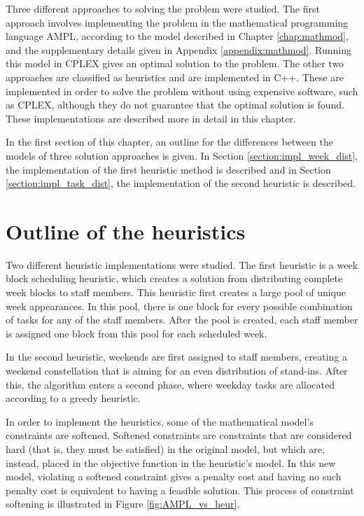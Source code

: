 
Three different approaches to solving the problem were studied. The first approach involves implementing the problem in the mathematical programming language AMPL, according to the model described in Chapter \ref{chap:mathmod}, and the supplementary details given in Appendix \ref{appendix:mathmod}. Running this model in CPLEX gives an optimal solution to the problem. The other two approaches are classified as heuristics and are implemented in C++. These are implemented in order to solve the problem without using expensive software, such as CPLEX, although they do not guarantee that the optimal solution is found. These implementations are described more in detail in this chapter.

In the first section of this chapter, an outline for the differences between the models of three solution approaches is given. In Section \ref{section:impl_week_dist}, the implementation of the first heuristic method is described and in Section \ref{section:impl_task_dist}, the implementation of the second heuristic is described.


\section{Outline of the heuristics}

Two different heuristic implementations were studied. The first heuristic is a week block scheduling heuristic, which creates a solution from distributing complete week blocks to staff members. This heuristic first creates a large pool of unique week appearances. In this pool, there is one block for every possible combination of tasks for any of the staff members. After the pool is created, each staff member is assigned one block from this pool for each scheduled week.

In the second heuristic, weekends are first assigned to staff members, creating a weekend constellation that is aiming for an even distribution of stand-ins. After this, the algorithm enters a second phase, where weekday tasks are allocated according to a greedy heuristic.

In order to implement the heuristics, some of the mathematical model's constraints are softened. Softened constraints are constraints that are considered hard (that is, they must be satisfied) in the original model, but which are, instead, placed in the objective function in the heuristic's model. In this new model, violating a softened constraint gives a penalty cost and having no such penalty cost is equivalent to having a feasible solution. This process of constraint softening is illustrated in Figure \ref{fig:AMPL_vs_heur}. 

